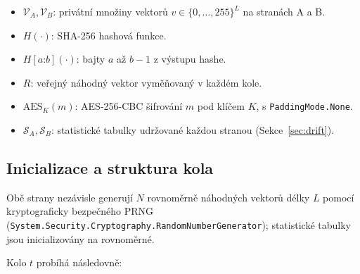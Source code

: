 \documentclass[11pt,a4paper]{article}
\begin{document}
\begin{itemize}[leftmargin=*]
\item $\mathcal{V}_A, \mathcal{V}_B$: privátní množiny vektorů $v \in \{0,\ldots,255\}^L$ na stranách A a B.
\item $H(\cdot)$: SHA-256 hashová funkce.
\item $H[a\mathord{:}b](\cdot)$: bajty $a$ až $b-1$ z výstupu hashe.
\item $R$: veřejný náhodný vektor vyměňovaný v každém kole.
\item $\mathrm{AES}_{K}(m)$: AES-256-CBC šifrování $m$ pod klíčem $K$, s \texttt{PaddingMode.None}.
\item $\mathcal{S}_A, \mathcal{S}_B$: statistické tabulky udržované každou stranou (Sekce~\ref{sec:drift}).
\end{itemize}

\subsection{Inicializace a struktura kola}

Obě strany nezávisle generují $N$ rovnoměrně náhodných vektorů délky $L$ pomocí kryptograficky bezpečného PRNG (\texttt{System.Security.Cryptography.RandomNumberGenerator}); statistické tabulky jsou inicializovány na rovnoměrné.

Kolo $t$ probíhá následovně:
\end{document}
